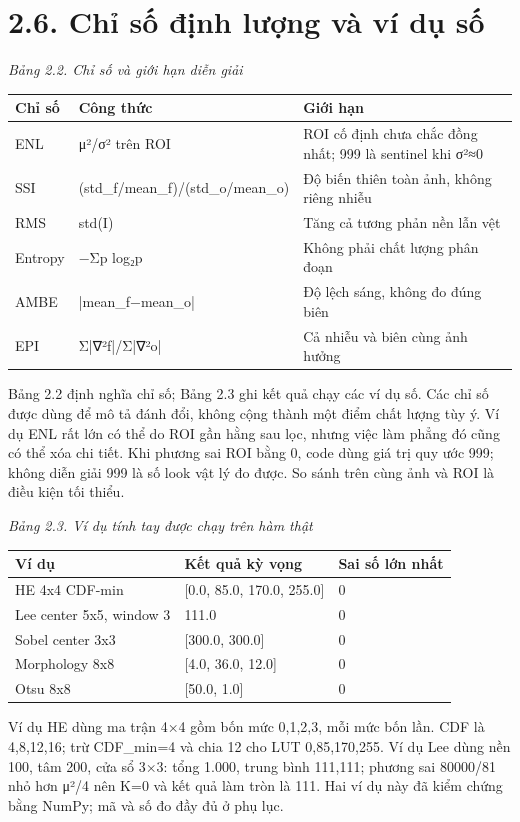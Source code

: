 \documentclass[13pt,a4paper]{extreport}
\begin{document}
\section*{2.6. Chỉ số định lượng và ví dụ số}
\noindent\textit{Bảng 2.2. Chỉ số và giới hạn diễn giải}
\begin{longtable}{p{4.87cm}|p{4.87cm}|p{4.87cm}}
Chỉ số & Công thức & Giới hạn\\\hline
ENL & μ²/σ² trên ROI & ROI cố định chưa chắc đồng nhất; 999 là sentinel khi σ²≈0\\\hline
SSI & (std\_f/mean\_f)/(std\_o/mean\_o) & Độ biến thiên toàn ảnh, không riêng nhiễu\\\hline
RMS & std(I) & Tăng cả tương phản nền lẫn vệt\\\hline
Entropy & −Σp log₂p & Không phải chất lượng phân đoạn\\\hline
AMBE & |mean\_f−mean\_o| & Độ lệch sáng, không đo đúng biên\\\hline
EPI & Σ|∇²f|/Σ|∇²o| & Cả nhiễu và biên cùng ảnh hưởng\\\hline
\end{longtable}
Bảng 2.2 định nghĩa chỉ số; Bảng 2.3 ghi kết quả chạy các ví dụ số. Các chỉ số được dùng để mô tả đánh đổi, không cộng thành một điểm chất lượng tùy ý. Ví dụ ENL rất lớn có thể do ROI gần hằng sau lọc, nhưng việc làm phẳng đó cũng có thể xóa chi tiết. Khi phương sai ROI bằng 0, code dùng giá trị quy ước 999; không diễn giải 999 là số look vật lý đo được. So sánh trên cùng ảnh và ROI là điều kiện tối thiểu.
\par
\noindent\textit{Bảng 2.3. Ví dụ tính tay được chạy trên hàm thật}
\begin{longtable}{p{4.87cm}|p{4.87cm}|p{4.87cm}}
Ví dụ & Kết quả kỳ vọng & Sai số lớn nhất\\\hline
HE 4x4 CDF-min & [0.0, 85.0, 170.0, 255.0] & 0\\\hline
Lee center 5x5, window 3 & 111.0 & 0\\\hline
Sobel center 3x3 & [300.0, 300.0] & 0\\\hline
Morphology 8x8 & [4.0, 36.0, 12.0] & 0\\\hline
Otsu 8x8 & [50.0, 1.0] & 0\\\hline
\end{longtable}
Ví dụ HE dùng ma trận 4×4 gồm bốn mức 0,1,2,3, mỗi mức bốn lần. CDF là 4,8,12,16; trừ CDF\_min=4 và chia 12 cho LUT 0,85,170,255. Ví dụ Lee dùng nền 100, tâm 200, cửa sổ 3×3: tổng 1.000, trung bình 111,111; phương sai 80000/81 nhỏ hơn μ²/4 nên K=0 và kết quả làm tròn là 111. Hai ví dụ này đã kiểm chứng bằng NumPy; mã và số đo đầy đủ ở phụ lục.
\par
\clearpage
\end{document}
